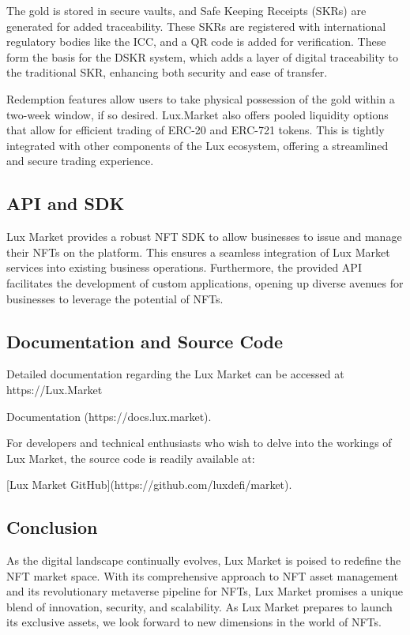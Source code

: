 \documentclass[11pt]{article}
\begin{document}
The gold is stored in secure vaults, and Safe Keeping Receipts (SKRs) are generated for added traceability. These SKRs are registered with international regulatory bodies like the ICC, and a QR code is added for verification. These form the basis for the DSKR system, which adds a layer of digital traceability to the traditional SKR, enhancing both security and ease of transfer.


Redemption features allow users to take physical possession of the gold within a two-week window, if so desired. Lux.Market also offers pooled liquidity options that allow for efficient trading of ERC-20 and ERC-721 tokens. This is tightly integrated with other components of the Lux ecosystem, offering a streamlined and secure trading experience.


\subsection{API and SDK}

Lux Market provides a robust NFT SDK to allow businesses to issue and manage their NFTs on the platform. This ensures a seamless integration of Lux Market services into existing business operations. Furthermore, the provided API facilitates the development of custom applications, opening up diverse avenues for businesses to leverage the potential of NFTs.


\subsection{Documentation and Source Code}

Detailed documentation regarding the Lux Market can be accessed at https://Lux.Market


Documentation (https://docs.lux.market).


For developers and technical enthusiasts who wish to delve into the workings of Lux Market, the source code is readily available at:


[Lux Market GitHub](https://github.com/luxdefi/market).


\subsection{Conclusion}

As the digital landscape continually evolves, Lux Market is poised to redefine the NFT market space. With its comprehensive approach to NFT asset management and its revolutionary metaverse pipeline for NFTs, Lux Market promises a unique blend of innovation, security, and scalability. As Lux Market prepares to launch its exclusive assets, we look forward to new dimensions in the world of NFTs.
\end{document}
